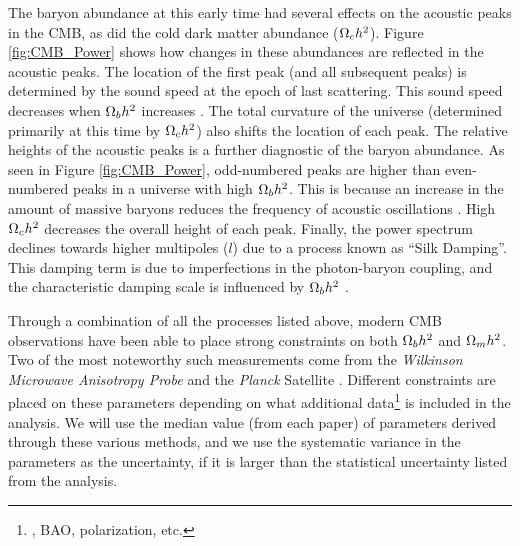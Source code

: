The baryon abundance at this early time had several effects on the
acoustic peaks in the CMB, as did the cold dark matter abundance
($\Omega_c h^2$). Figure \ref{fig:CMB_Power} shows how changes in these
abundances are reflected in the acoustic peaks. The location of the
first peak (and all subsequent peaks) is determined by the sound speed
at the epoch of last scattering. This sound speed decreases when
$\Omega_b h^2$ increases \citep[][ch.~9.8]{Mukhanov2005}. The total
curvature of the universe (determined primarily at this time by
$\Omega_c h^2$) also shifts the location of each peak. The relative
heights of the acoustic peaks is a further diagnostic of the baryon
abundance. As seen in Figure \ref{fig:CMB_Power}, odd-numbered peaks
are higher than even-numbered peaks in a universe with high $\Omega_b
h^2$. This is because an increase in the amount of massive baryons
reduces the frequency of acoustic oscillations
\citep[][ch.~8.7.3]{Dodelson2003}. High $\Omega_c h^2$ decreases the
overall height of each peak. Finally, the power spectrum declines
towards higher multipoles ($l$) due to a process known as ``Silk
Damping''. This damping term is due to imperfections in the
photon-baryon coupling, and the characteristic damping scale is
influenced by $\Omega_b h^2$ \citep[][ch.~4.7]{Durrer2008}.

Through a combination of all the processes listed above, modern CMB
observations have been able to place strong constraints on both
$\Omega_b h^2$ and $\Omega_m h^2$. Two of the most noteworthy such
measurements come from the \textit{Wilkinson Microwave Anisotropy
  Probe} \citep[\WMAP{},][]{Bennett2003} and the \textit{Planck} Satellite
\citep{PlanckResultsI}. Different constraints are placed on these
parameters depending on what additional data\footnote{\Ho, BAO,
  polarization, etc.} is included in the analysis. We will use the
median value (from each paper) of parameters derived through these
various methods, and we use the systematic variance in the parameters as
the uncertainty, if it is larger than the statistical uncertainty
listed from the analysis.

